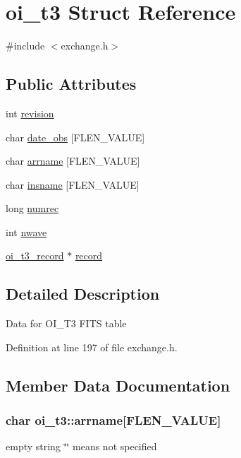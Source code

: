 \hypertarget{structoi__t3}{
\section{oi\_\-t3 Struct Reference}
\label{structoi__t3}
}


{\ttfamily \#include $<$exchange.h$>$}

\subsection*{Public Attributes}
\begin{DoxyCompactItemize}
\item 
int \hyperlink{structoi__t3_ad167447275dd252665cd6488e9947c4c}{revision}
\item 
char \hyperlink{structoi__t3_a27af7378e096d383e46e283eba0e6204}{date\_\-obs} \mbox{[}FLEN\_\-VALUE\mbox{]}
\item 
char \hyperlink{structoi__t3_ada0c8b7b3f6e0f1da5b9bda4e15078a1}{arrname} \mbox{[}FLEN\_\-VALUE\mbox{]}
\item 
char \hyperlink{structoi__t3_af2db7713353420b4b50cef80cbf9a2ad}{insname} \mbox{[}FLEN\_\-VALUE\mbox{]}
\item 
long \hyperlink{structoi__t3_a73fa1367bf5eea5a275b91936863218c}{numrec}
\item 
int \hyperlink{structoi__t3_aa93f9e594f282e81b4adaea9ac9771f7}{nwave}
\item 
\hyperlink{structoi__t3__record}{oi\_\-t3\_\-record} $\ast$ \hyperlink{structoi__t3_a359365283adb0116ce519fe412c0433a}{record}
\end{DoxyCompactItemize}


\subsection{Detailed Description}
Data for OI\_\-T3 FITS table 

Definition at line 197 of file exchange.h.



\subsection{Member Data Documentation}
\hypertarget{structoi__t3_ada0c8b7b3f6e0f1da5b9bda4e15078a1}{
\subsubsection[{arrname}]{\setlength{\rightskip}{0pt plus 5cm}char {\bf oi\_\-t3::arrname}\mbox{[}FLEN\_\-VALUE\mbox{]}}}
\label{structoi__t3_ada0c8b7b3f6e0f1da5b9bda4e15078a1}
empty string \char`\"{}\char`\"{} means not specified 

